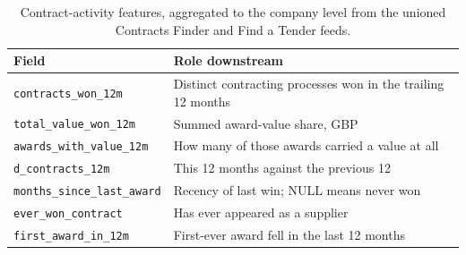 \documentclass[    author={Samuel Menon Demelo; Sneha Saphala Ram Prasad; 
Viktor Ander Lindholm; Vishal Khatri},
               supervisor={Prof. Fernando Moreno-Pino},
                   degree={MSc},
                    title={Lloyds Commercial Banking Intelligence},
                 subtitle={Ranking SME Lending, Risk and Growth Prospects for Lloyds Banking Group},
                     type={},
                     year={2026}]{dissertation}
\begin{document}
\begin{collapsable}
\begin{table}[htbp]
\centering
\small
\caption[Contract-activity features]{Contract-activity features, aggregated to the company level from the
unioned Contracts Finder and Find a Tender feeds.}
\label{tab:contract-fields}
\begin{tabular}{@{}lp{7.6cm}@{}}
\toprule
\textbf{Field} & \textbf{Role downstream} \\
\midrule
\texttt{contracts\_won\_12m}
    & Distinct contracting processes won in the trailing 12 months \\
\texttt{total\_value\_won\_12m}
    & Summed award-value share, GBP \\
\texttt{awards\_with\_value\_12m}
    & How many of those awards carried a value at all \\
\texttt{d\_contracts\_12m}
    & This 12 months against the previous 12 \\
\texttt{months\_since\_last\_award}
    & Recency of last win; NULL means never won \\
\texttt{ever\_won\_contract}
    & Has ever appeared as a supplier \\
\texttt{first\_award\_in\_12m}
    & First-ever award fell in the last 12 months \\
\bottomrule
\end{tabular}
\end{table}
\end{collapsable}
\end{document}

